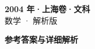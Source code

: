 \documentclass[zihao=-4, a4paper]{ctexart}
\begin{document}
\begin{center}
  {\Large\bfseries 2004 年·上海卷·文科}\\[4pt]
  {\large 数学 · 解析版}
\end{center}
\medskip
{}

\clearpage
{}
\begin{center}{\Large\bfseries 参考答案与详细解析}\end{center}
\medskip

\end{document}
